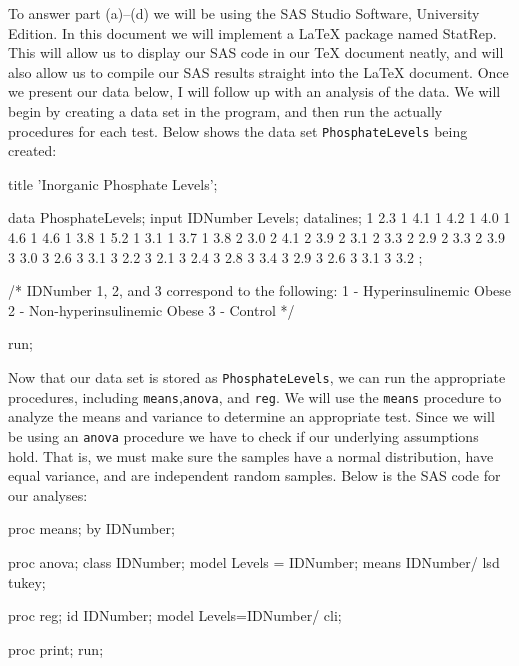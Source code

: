 \documentclass[oneside,10pt]{article}
\begin{document}
	To answer part (a)--(d) we will be using the SAS Studio Software, University Edition. In this document we will implement a \LaTeX \hspace{0.5mm} package named StatRep. This will allow us to display our SAS code in our \TeX \hspace{0.5mm} document neatly, and will also allow us to compile our SAS results straight into the \LaTeX \hspace{0.5mm} document. Once we present our data below, I will follow up with an analysis of the data. We will begin by creating a data set in the program, and then run the actually procedures for each test. Below shows the data set \texttt{PhosphateLevels} being created:
	\begin{Datastep}[first=8, last=11]
		title 'Inorganic Phosphate Levels';

		data PhosphateLevels;
			input IDNumber Levels;
			datalines;
				1 2.3	
				1 4.1
				1 4.2
				1 4.0
				1 4.6
				1 4.6
				1 3.8
				1 5.2
				1 3.1
				1 3.7
				1 3.8
				2 3.0
				2 4.1
				2 3.9
				2 3.1
				2 3.3
				2 2.9
				2 3.3
				2 3.9
				3 3.0
				3 2.6
				3 3.1
				3 2.2
				3 2.1
				3 2.4
				3 2.8
				3 3.4
				3 2.9
				3 2.6
				3 3.1
				3 3.2
				;
				
				/* IDNumber 1, 2, and 3 correspond to the following:
					1 - Hyperinsulinemic Obese
					2 - Non-hyperinsulinemic Obese
					3 - Control */
					
		run;
	\end{Datastep}
Now that our data set is stored as \texttt{PhosphateLevels}, we can run the appropriate procedures, including \texttt{means},\texttt{anova}, and \texttt{reg}. We will use the \texttt{means} procedure to analyze the means and variance to determine an appropriate test. Since we will be using an \texttt{anova} procedure we have to check if our underlying assumptions hold. That is, we must make sure the samples have a normal distribution, have equal variance, and are independent random samples. Below is the SAS code for our analyses:
	\begin{Sascode}[store=hw]
		proc means;
			by IDNumber;
			
		proc anova;
			class IDNumber;
			model Levels = IDNumber;
			means IDNumber/ lsd tukey;
			
		proc reg;
			id IDNumber;
			model Levels=IDNumber/ cli;
			
		proc print;
		run;
	\end{Sascode}
	
   
\end{document}
